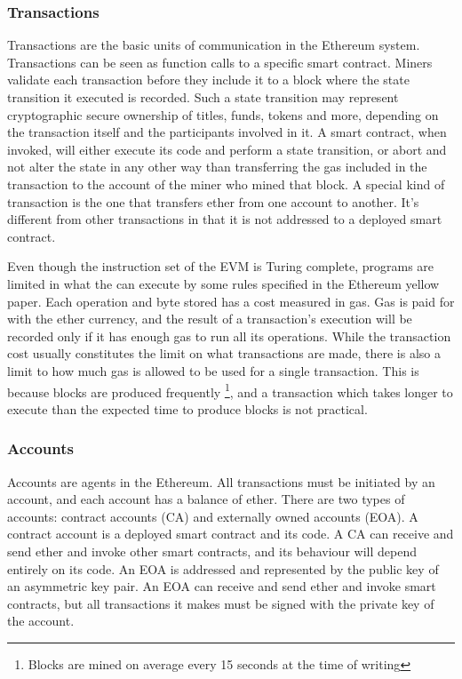 \subsubsection{Transactions}
Transactions are the basic units of communication in the Ethereum system. Transactions can be seen as function calls to a specific smart contract. Miners validate each transaction before they include it to a block where the state transition it executed is recorded. Such a state transition may represent cryptographic secure ownership of titles, funds, tokens and more, depending on the transaction itself and the participants involved in it. A smart contract, when invoked, will either execute its code and perform a state transition, or abort and not alter the state in any other way than transferring the gas included in the transaction to the account of the miner who mined that block. A special kind of transaction is the one that transfers ether from one account to another. It's different from other transactions in that it is not addressed to a deployed smart contract.

Even though the instruction set of the EVM is Turing complete, programs are limited in what the can execute by some rules specified in the Ethereum yellow paper. Each operation and byte stored has a cost measured in gas. Gas is paid for with the ether currency, and the result of a transaction's execution will be recorded only if it has enough gas to run all its operations. While the transaction cost usually constitutes the limit on what transactions are made, there is also a limit to how much gas is allowed to be used for a single transaction. This is because blocks are produced frequently \footnote{Blocks are mined on average every 15 seconds at the time of writing}, and a transaction which takes longer to execute than the expected time to produce blocks is not practical. 

\subsubsection{Accounts}
Accounts are agents in the Ethereum. All transactions must be initiated by an account, and each account has a balance of ether. There are two types of accounts: contract accounts (CA) and externally owned accounts (EOA). A contract account is a deployed smart contract and its code. A CA can receive and send ether and invoke other smart contracts, and its behaviour will depend entirely on its code. An EOA is addressed and represented by the public key of an asymmetric key pair. An EOA can receive and send ether and invoke smart contracts, but all transactions it makes must be signed with the private key of the account. 

